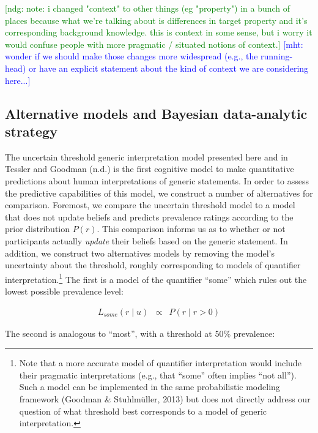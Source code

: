 \documentclass[,man,floatsintext]{apa6}
\let\rmarkdownfootnote\footnote%
\def\footnote{\protect\rmarkdownfootnote}
\theoremstyle{definition}
\theoremstyle{definition}
\theoremstyle{definition}
\theoremstyle{remark}
\begin{document}
{\textcolor{Green}{[ndg: note: i changed "context" to other things (eg "property") in a bunch of places because what we're talking about is differences in target property and it's corresponding background knowledge. this is context in some sense, but i worry it would confuse people with more pragmatic / situated notions of context.]}}
{\textcolor{Blue}{[mht: wonder if we should make those changes more widespread (e.g., the running-head) or have an explicit statement about the kind of context we are considering here...]}}

\hypertarget{alternative-models-and-bayesian-data-analytic-strategy}{%
\subsection{Alternative models and Bayesian data-analytic
strategy}\label{alternative-models-and-bayesian-data-analytic-strategy}}

The uncertain threshold generic interpretation model presented here and
in Tessler and Goodman (n.d.) is the first cognitive model to make
quantitative predictions about human interpretations of generic
statements. In order to assess the predictive capabilities of this
model, we construct a number of alternatives for comparison. Foremost,
we compare the uncertain threshold model to a model that does not update
beliefs and predicts prevalence ratings according to the prior
distribution \(P(r)\). This comparison informs us as to whether or not
participants actually \emph{update} their beliefs based on the generic
statement. In addition, we construct two alternatives models by removing
the model's uncertainty about the threshold, roughly corresponding to
models of quantifier interpretation.\footnote{Note that a more accurate
  model of quantifier interpretation would include their pragmatic
  interpretations (e.g., that \enquote{some} often implies \enquote{not
  all}). Such a model can be implemented in the same probabilistic
  modeling framework (Goodman \& Stuhlmüller, 2013) but does not
  directly address our question of what threshold best corresponds to a
  model of generic interpretation.} The first is a model of the
quantifier \enquote{some} which rules out the lowest possible prevalence
level:

\begin{eqnarray}
L_{some}(r \mid u) &\propto&  P(r \mid r > 0)  \label{eq:someModel}
\end{eqnarray}

The second is analogous to \enquote{most}, with a threshold at 50\%
prevalence:
\end{document}
